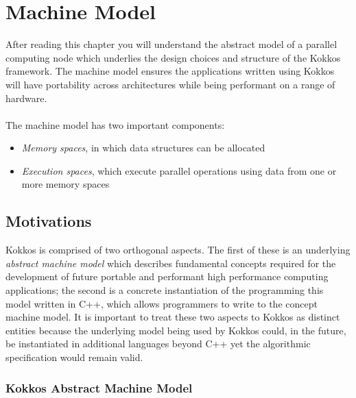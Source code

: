 \chapter{Machine Model}
\label{C:Model}

After reading this chapter you will understand the abstract model
of a parallel computing node which underlies the design choices
and structure of the Kokkos framework. The machine model ensures
the applications written using Kokkos will have portability across
architectures while being performant on a range of hardware.\\
\\
\noindent
The machine model has two important components:
\begin{itemize}
\item \emph{Memory spaces}, in which data structures can be allocated
\item \emph{Execution spaces}, which execute parallel operations using
  data from one or more memory spaces
\end{itemize}

\section{Motivations}\label{S:Model:Motivations}

Kokkos is comprised of two orthogonal aspects. The first of these is 
an underlying {\em abstract machine model} which describes fundamental
concepts required for the development of future portable and performant
high performance computing applications; the second is a concrete instantiation
of the programming this model written in C++, which allows programmers
to write to the concept machine model. It is important to treat these
two aspects to Kokkos as distinct entities because the underlying model
being used by Kokkos could, in the future, be instantiated in additional
languages beyond C++ yet the algorithmic specification would remain
valid.

\subsection{Kokkos Abstract Machine Model}

